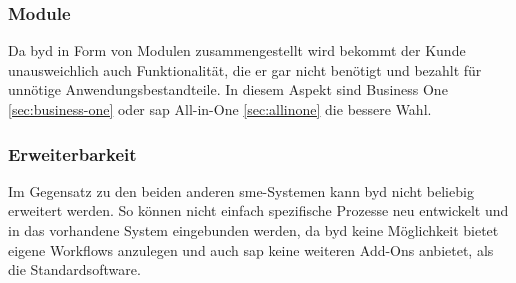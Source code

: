 \subsubsection{Module}

Da \gls{byd} in Form von Modulen zusammengestellt wird bekommt der Kunde unausweichlich auch Funktionalität, die er gar nicht benötigt und bezahlt für unnötige Anwendungsbestandteile. In diesem Aspekt sind Business One \ref{sec:business-one} oder \gls{sap} All-in-One \ref{sec:allinone} die bessere Wahl.

\subsubsection{Erweiterbarkeit}

Im Gegensatz zu den beiden anderen \gls{sme}-Systemen kann \gls{byd} nicht beliebig erweitert werden. So können nicht einfach spezifische Prozesse neu entwickelt und in das vorhandene System eingebunden werden, da \gls{byd} keine Möglichkeit bietet eigene Workflows anzulegen und auch \gls{sap} keine weiteren Add-Ons anbietet, als die Standardsoftware.

